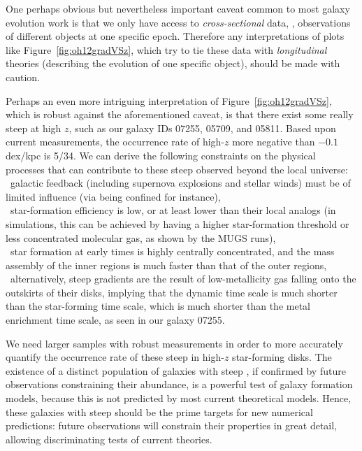 One perhaps obvious but nevertheless important caveat common to most galaxy evolution work is
that we only have access to \emph{cross-sectional} data, \ie, observations of different
objects at one specific epoch. Therefore any interpretations of plots like
Figure~\ref{fig:oh12gradVSz}, which try to tie these data with \emph{longitudinal} theories
(describing the evolution of one specific object), should be made with caution.

Perhaps an even more intriguing interpretation of Figure~\ref{fig:oh12gradVSz}, which is
robust against the aforementioned caveat, is that there exist some really steep \mgs at high
$z$, such as our galaxy IDs 07255, 05709, and 05811.
Based upon current measurements, the occurrence rate of high-$z$ \mgs more negative than $-0.1$ dex/kpc is 5/34.
We can derive the following constraints on the physical processes that can contribute to
these steep \mgs observed beyond the local universe:\\
\indent\textbullet~galactic feedback (including supernova explosions and stellar winds) must
be of limited influence (via being confined for instance), \\
\indent\textbullet~star-formation efficiency is low, or at least lower than their local
analogs (in simulations, this can be achieved by having a higher star-formation threshold or
less concentrated molecular gas, as shown by the MUGS runs), \\
\indent\textbullet~star formation at early times is highly centrally
concentrated, and the mass assembly of the inner regions is much faster than that of the outer regions, \\
\indent\textbullet~alternatively, steep gradients are the result of low-metallicity
gas falling onto the outskirts of their disks, implying that the dynamic time scale is much
shorter than the star-forming time scale, which is much shorter than the metal enrichment
time scale, as seen in our galaxy 07255.

We need larger samples with robust measurements in order to more accurately quantify the
occurrence rate of these steep \mgs in high-$z$ star-forming disks.
The existence of a distinct population of galaxies with steep \mgs, if confirmed by future
observations constraining their abundance, is a powerful test of galaxy formation models,
because this is not predicted by most current theoretical models.
Hence, these galaxies with steep \mgs should be the prime targets for new numerical
predictions: future \jwst observations will constrain their properties in great detail,
allowing discriminating tests of current theories.

